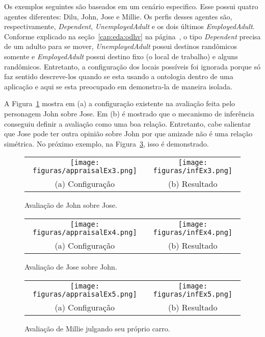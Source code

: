 Os exemplos seguintes são baseados em um cenário especifico. Esse possui
quatro agentes diferentes: Dilu, John, Jose e Millie. Os perfis desses agentes
são, respectivamente, \emph{Dependent}, \emph{UnemployedAdult} e os dois
últimos \emph{EmployedAdult}. Conforme explicado na seção~\ref{cap:eda:odhv}
na página~\pageref{ex:tipos}, o tipo \emph{Dependent} precisa de um adulto
para se mover, \emph{UnemployedAdult} possui destinos randômicos somente e
\emph{EmployedAdult} possui destino fixo (o local de trabalho) e alguns
randômicos. Entretanto, a configuração dos locais possíveis foi ignorada
porque só faz sentido descreve-los quando se esta usando a ontologia
dentro de uma aplicação e aqui se esta preocupado em demonstra-la de maneira
isolada.

A Figura~\ref{fig:tp:cdu:johnHasFriendJose} mostra em (a) a configuração
existente na avaliação feita pelo personagem John sobre Jose. Em (b) é
mostrado que o mecanismo de inferência conseguiu definir a avaliação como uma
boa relação. Entretanto, cabe salientar que Jose pode ter outra opinião sobre
John por que amizade não é uma relação simétrica. No próximo exemplo, na
Figura~\ref{fig:tp:cdu:joseHasEnemyJohn}, isso é demonstrado.

\newpage

\begin{figure}
  \centering
  \begin{tabular}{cc}
  \texttt{[image: figuras/appraisalEx3.png]} & \texttt{[image: figuras/infEx3.png]} \\
  (a) Configuração & (b) Resultado
  \end{tabular}
  \caption{Avaliação de John sobre Jose.}
  \label{fig:tp:cdu:johnHasFriendJose}
\end{figure}

\begin{figure}
  \centering
  \begin{tabular}{cc}
  \texttt{[image: figuras/appraisalEx4.png]} & \texttt{[image: figuras/infEx4.png]} \\
  (a) Configuração & (b) Resultado
  \end{tabular}
  \caption{Avaliação de Jose sobre John.}
  \label{fig:tp:cdu:joseHasEnemyJohn}
\end{figure}


\begin{figure}
  \centering
  \begin{tabular}{cc}
  \texttt{[image: figuras/appraisalEx5.png]} & \texttt{[image: figuras/infEx5.png]} \\
  (a) Configuração & (b) Resultado
  \end{tabular}
  \caption{Avaliação de Millie julgando seu próprio carro.}
  \label{fig:tp:cdu:joseHasEnemyJohn}
\end{figure}

